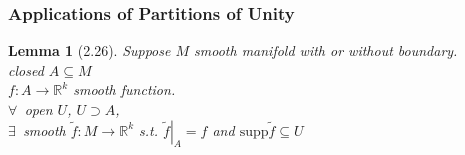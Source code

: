 \documentclass[11pt]{amsart}
\newtheorem{lemma}{Lemma}
\theoremstyle{definition}
\begin{document}
\subsubsection*{Applications of Partitions of Unity}


\begin{lemma}[2.26]
Suppose $M$ smooth manifold with or without boundary. \\
closed $A \subseteq M$ \\
$f:A \to \mathbb{R}^k$ smooth function. \\

$\forall \, $ open $U$, $U \supset A$, \\
\quad $\exists \, $ smooth $\widetilde{f} : M \to \mathbb{R}^k$ s.t. $\left. \widetilde{f}\right|_A = f$ and $\text{supp}{ \widetilde{f}}\subseteq U$
\end{lemma}
\end{document}
